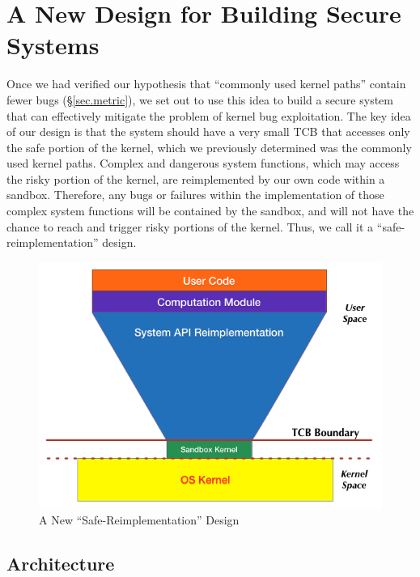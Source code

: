 \section{A New Design for Building Secure Systems}
\label{sec.design}

Once we had verified our hypothesis that ``commonly used kernel paths'' contain fewer bugs (\S{\ref{sec.metric}}), 
we set out to use this idea to build a secure system that can effectively mitigate 
the problem of kernel bug exploitation. The key idea of our design is that the system 
should have a very small TCB that accesses only the safe portion of the kernel, 
which we previously determined was the commonly used kernel paths. 
Complex and dangerous system functions, which may access the risky portion of the kernel, 
are reimplemented by our own code within a sandbox. 
Therefore, any bugs or failures within the implementation of those complex system functions 
will be contained by the sandbox, and will not have the chance to reach 
and trigger risky portions of the kernel. Thus, we call it a ``safe-reimplementation'' design.

\begin{figure}[h]
\centering
\includegraphics[width=1.0\columnwidth]{diagram/lind_secure_design.png}
\caption{A New ``Safe-Reimplementation'' Design}
\label{fig:design}
\end{figure}

\subsection{Architecture}

